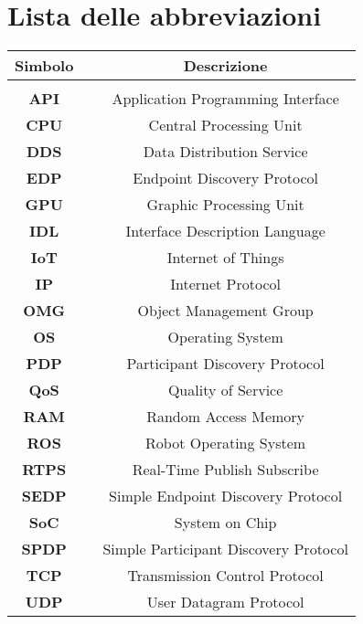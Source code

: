 

\fancyhf{}
\thispagestyle{plain}

\chapter[Lista delle abbreviazioni]{\centering Lista delle abbreviazioni}
\fontsize{14}{14}\selectfont

\begin{center}
\centering
\setlength{\tabcolsep}{15pt}
\fontsize{14}{14}\selectfont
\begin{tabular}{ c c c }
\multicolumn{1}{c}{\Large \textbf{Simbolo}} & & \multicolumn{1}{c}{\Large \textbf{Descrizione}}\\
\hline\hline\\

\textbf{API}  & & Application Programming Interface\\
\textbf{CPU}  & & Central Processing Unit\\
\textbf{DDS}  & & Data Distribution Service\\
\textbf{EDP}  & & Endpoint Discovery Protocol\\
\textbf{GPU}  & & Graphic Processing Unit\\
\textbf{IDL}  & & Interface Description Language\\
\textbf{IoT}  & & Internet of Things\\
\textbf{IP}   & & Internet Protocol\\
\textbf{OMG}  & & Object Management Group\\
\textbf{OS}   & & Operating System\\
\textbf{PDP}  & & Participant Discovery Protocol\\
\textbf{QoS}  & & Quality of Service\\
\textbf{RAM}  & & Random Access Memory\\
\textbf{ROS}  & & Robot Operating System\\
\textbf{RTPS} & & Real-Time Publish Subscribe\\
\textbf{SEDP} & & Simple Endpoint Discovery Protocol\\
\textbf{SoC}  & & System on Chip\\
\textbf{SPDP} & & Simple Participant Discovery Protocol\\
\textbf{TCP}  & & Transmission Control Protocol\\
\textbf{UDP}  & & User Datagram Protocol\\

\end{tabular}
\end{center}

\restoregeometry
